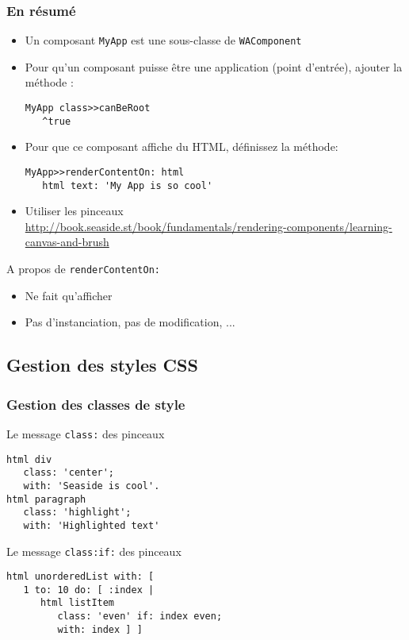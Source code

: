 \documentclass[9pt,compress]{beamer}
\newcommand{\code}[1]{\texttt{\textup{\NoAutoSpaceBeforeFDP #1\AutoSpaceBeforeFDP}}} %
\begin{document}
\begin{frame}[containsverbatim]\frametitle{En résumé}
	\begin{block}{}
		\begin{itemize}
			\item Un composant \code{MyApp} est une sous-classe de \code{WAComponent}
			\item Pour qu'un composant puisse être une application (point d'entrée), ajouter la méthode :
\begin{verbatim}
MyApp class>>canBeRoot
   ^true
\end{verbatim}				
			\item Pour que ce composant affiche du HTML, définissez la méthode:
\begin{verbatim}
MyApp>>renderContentOn: html
   html text: 'My App is so cool'
\end{verbatim}	
			\item Utiliser les pinceaux\\
			\url{http://book.seaside.st/book/fundamentals/rendering-components/learning-canvas-and-brush}
					
		\end{itemize}
	\end{block}
	
	\begin{alertblock}{A propos de \code{renderContentOn:}}
		\begin{itemize}
			\item Ne fait qu'afficher
			\item Pas d'instanciation, pas de modification, ...
		\end{itemize}
	\end{alertblock}
	
	
\end{frame}


\subsection{Gestion des styles CSS} %


\begin{frame}[containsverbatim]\frametitle{Gestion des classes de style}
	
	\begin{block}{Le message \code{class:} des pinceaux}
\begin{verbatim}
html div
   class: 'center';
   with: 'Seaside is cool'.
html paragraph
   class: 'highlight';
   with: 'Highlighted text'
\end{verbatim}
	\end{block}
	
		\begin{block}{Le message \code{class:if:} des pinceaux}
	\begin{verbatim}
html unorderedList with: [
   1 to: 10 do: [ :index |
      html listItem
         class: 'even' if: index even;
         with: index ] ]
	\end{verbatim}
	\end{block}
\end{frame}
\end{document}
